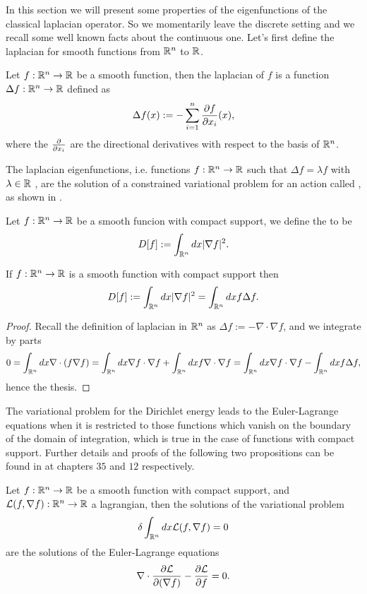 \documentclass[../2.tex]{subfiles}
\begin{document}
In this section we will present some properties of the eigenfunctions of the classical laplacian operator.
So we momentarily leave the discrete setting and we recall some well known facts about the continuous one.
Let's first define the laplacian for smooth functions from $\mathbb{R}^n$ to $\mathbb{R}$. 

\begin{defn}
    Let $f : \mathbb{R}^n \to \mathbb{R}$ be a smooth function, then the laplacian of $f$ is a function $\Delta f : \mathbb{R}^n \to \mathbb{R}$ defined as
    \[ \Delta f(x) := - \sum_{i=1}^n \frac{\partial f}{\partial x_i}(x), \]
    where the $\frac{\partial}{\partial x_i}$ are the directional derivatives with respect to the basis of $\mathbb{R}^n$.
\end{defn}

The laplacian eigenfunctions, i.e. functions $f: \mathbb{R}^n \to \mathbb{R}$ such that $\Delta f = \lambda f$ with $\lambda \in \mathbb{R}$ , are the solution of a constrained variational problem for an action called , as shown in \cite{bronstein}.

\begin{defn}
    Let $f:\mathbb{R}^n \to \mathbb{R}$ be a smooth funcion with compact support, we define the  to be
    \[ D[f] := \int_{\mathbb{R}^n} dx |\nabla f|^2 .\]
\end{defn}

\begin{prop}
    If $f:\mathbb{R}^n \to\mathbb{R}$ is a smooth function with compact support then 
    \[ D[f] := \int_{\mathbb{R}^n} dx |\nabla f|^2 = \int_{\mathbb{R}^n} dx f\Delta f .\]
    \label{prop:2:4:3}
\end{prop}
\begin{proof}
    Recall the definition of laplacian in $\mathbb{R}^n$ as $\Delta f := -\nabla \cdot \nabla f$, and we integrate by parts
    \[ 0 = \int_{\mathbb{R}^n} dx \nabla \cdot (f \nabla f) = \int_{\mathbb{R}^n} dx \nabla f \cdot \nabla f + \int_{\mathbb{R}^n} dx f \nabla \cdot \nabla f = \int_{\mathbb{R}^n} dx \nabla f \cdot \nabla f - \int_{\mathbb{R}^n} dx f \Delta f, \]
    hence the thesis. \qedhere
\end{proof}

The variational problem for the Dirichlet energy leads to the Euler-Lagrange equations when it is restricted to those functions which
vanish on the boundary of the domain of integration, which is true in the case of functions with compact support.
Further details and proofs of the following two propositions can be found in \cite{fomin} at chapters $35$ and $12$ respectively.

\begin{prop}
    Let $f:\mathbb{R}^n \to \mathbb{R}$ be a smooth function with compact support, and $\mathcal{L}(f,\nabla f) : \mathbb{R}^n \to \mathbb{R}$ a lagrangian,
    then the solutions of the variational problem 
    \[ \delta\int_{\mathbb{R}^n} dx \mathcal{L}(f,\nabla f) = 0 \]
    are the solutions of the Euler-Lagrange equations
    \[ \nabla \cdot \frac{\partial \mathcal{L}}{\partial(\nabla f)} - \frac{\partial\mathcal{L}}{\partial f} = 0. \]
\end{prop}
\end{document}
